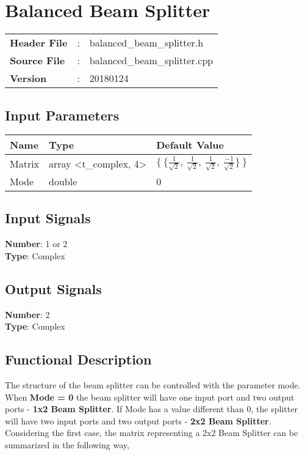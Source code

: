 \clearpage

\section{Balanced Beam Splitter}

\begin{tcolorbox}	
\begin{tabular}{p{2.75cm} p{0.2cm} p{10.5cm}} 	
\textbf{Header File}   &:& balanced\_beam\_splitter.h \\
\textbf{Source File}   &:& balanced\_beam\_splitter.cpp \\
\textbf{Version}       &:& 20180124
\end{tabular}
\end{tcolorbox}

\subsection*{Input Parameters}

\begin{table}[H]
\centering
\begin{tabular}{|l|l|l|}
\hline
Name           & Type    & Default Value     \\ \hline
Matrix         & array <t\_complex, 4> & $\lbrace~\lbrace \frac{1}{\sqrt{2}},~\frac{1}{\sqrt{2}},~\frac{1}{\sqrt{2}},~\frac{-1}{\sqrt{2}} \rbrace~\rbrace$                             \\ \hline
Mode           & double  & 0                 \\ \hline
\end{tabular}
\end{table}

\subsection*{Input Signals}

\textbf{Number}: 1 or 2\\
\textbf{Type}: Complex

\subsection*{Output Signals}

\textbf{Number}: 2\\
\textbf{Type}: Complex

\subsection*{Functional Description}
The structure of the beam splitter can be controlled with the parameter mode.\\
When \textbf{Mode = 0} the beam splitter will have one input port and two output ports - \textbf{1x2 Beam Splitter}. If Mode has a value different than 0, the splitter will have two input ports and two output ports - \textbf{2x2 Beam Splitter}.\\
Considering the first case, the matrix representing a 2x2 Beam Splitter can be summarized in the following way,

